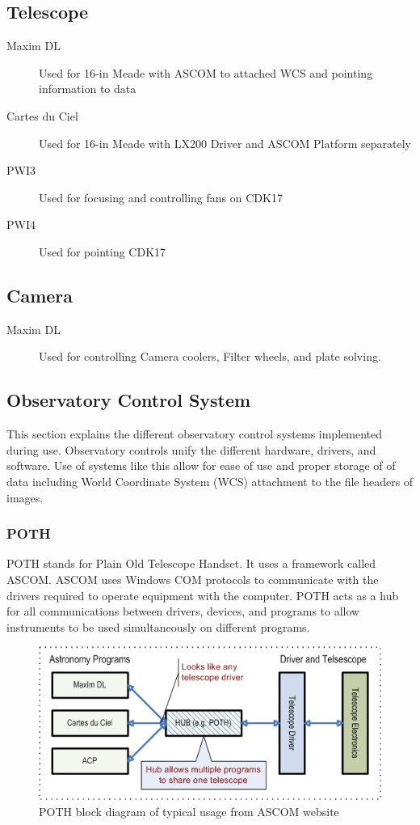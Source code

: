 \subsection{Telescope}
\begin{description}
    \item[Maxim DL] Used for 16-in Meade with ASCOM to attached WCS and pointing information to data
    \item[Cartes du Ciel] Used for 16-in Meade with LX200 Driver and ASCOM Platform separately 
    \item[PWI3] Used for focusing and controlling fans on CDK17
    \item[PWI4] Used for pointing CDK17
\end{description}

\subsection{Camera}
\begin{description}
    \item[Maxim DL] Used for controlling Camera coolers, Filter wheels, and plate solving.
\end{description}

\subsection{Observatory Control System}
This section explains the different observatory control systems implemented during use.
Observatory controls unify the different hardware, drivers, and software. 
Use of systems like this allow for ease of use and proper storage of of data including World Coordinate System (WCS) attachment to 
the file headers of images.

\subsubsection{POTH}
POTH stands for Plain Old Telescope Handset. It uses a framework called ASCOM\@.
ASCOM uses Windows COM protocols to communicate with the drivers required to operate equipment with the computer.
POTH acts as a hub for all communications between drivers, devices, and programs to allow instruments to be used simultaneously 
on different programs.
\begin{figure}[h]
    \centering
    \includegraphics[width=\columnwidth]{figures/poth.png}
    \caption{POTH block diagram of typical usage from ASCOM website~\protect\cite{ascom}}
\label{fig:poth}
\end{figure}

